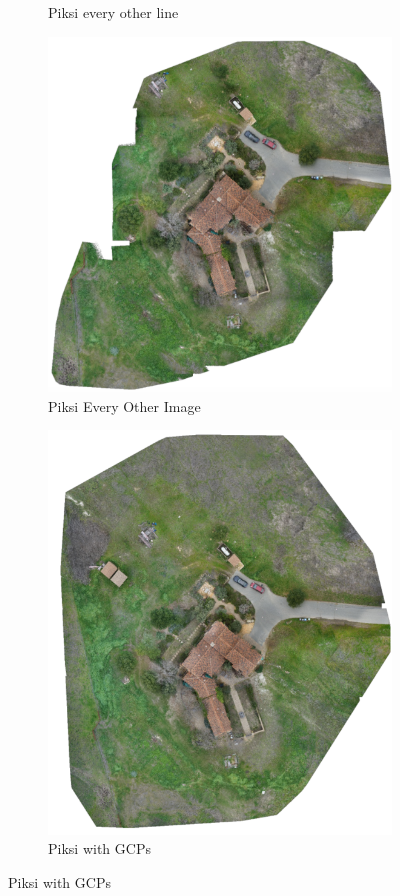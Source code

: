 \documentclass{article}
\begin{document}
\begin{figure}
\begin{subfigure}{.33\textwidth}
  \caption{Piksi every other line}
  \label{fig:sub2}
\end{subfigure}
\begin{subfigure}{.33\textwidth}
  \centering
  \includegraphics[width=.75\linewidth]{images/orthomosaics/p_every_other_image.png}
  \caption{Piksi Every Other Image}
  \label{fig:sub1}
\end{subfigure}%
\begin{subfigure}{.33\textwidth}
  \centering
  \includegraphics[width=.75\linewidth]{images/orthomosaics/p_gcp.png}
  \caption{Piksi with GCPs}

\end{subfigure}
\end{figure}
\end{document}
